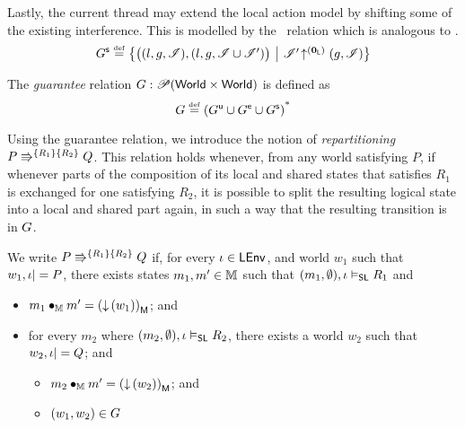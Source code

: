 Lastly, the current thread may extend the local action model by shifting some of the existing interference. This is modelled by the \shiftG\ relation which is analogous to \shiftR.
%
\[
\shiftG \eqdef
\left\{
\begin{array}{@{} l @{\hspace*{5pt}} | @{\hspace*{5pt}} r @{}}
  \left(
  \begin{array}{@{} l @{}}
    (l, g, \lmod),
    \left( l, g, \lmod \cup \lmod'  \right)
  \end{array}
  \right)
  &
  \expandsAM{\lmod'}{\unitL}{g}{\lmod}
\end{array}
\right\}
\]

\begin{definition}[Guarantee]
The \emph{guarantee} relation $\guarantee: \powerset (\Worlds \times \Worlds)$ is defined as
\[
\guarantee \eqdef  \left( \updateG \cup \extendG \cup \shiftG \right)^{\text{*}}
\]
\end{definition}

Using the guarantee relation, we introduce the notion of \emph{repartitioning} $\repartitions{P}{Q}{R_1}{R_2}$. This relation holds whenever, from any world satisfying $P$, if whenever parts of the composition of its local and shared states that satisfies $R_1$ is exchanged for one satisfying $R_2$, it is possible to split the resulting logical state into a local and shared part again, in such a way that the resulting transition is in $\guarantee$.
%
%
\begin{definition}[Repartitioning] \label{def:repartitioning}
We write $\repartitions{P}{Q}{R_1}{R_2}$ if, for every $\lenv \in \LEnv$, and world $w_1$ such that $w_1, \lenv |= P$, there exists states $m_1, m' \in \Heaps$ such that $(m_1, \emptyset), \lenv \slsat R_1$ and
\begin{itemize} 
\item $m_1 \composeH m' = \heapPart{\left(\collapseW{w_1}\right)}$; and
\item for every $m_2$ where $(m_2, \emptyset), \lenv \slsat R_2$,
  there exists a world $w_2$ such that $w_2, \lenv |= Q$; and
  \begin{itemize}
  	\item $m_2 \composeH m' = \heapPart{\left(\collapseW{w_2}\right)}$; and
  	\item $(w_1, w_2) \in \guarantee$
  \end{itemize}
\end{itemize}
\end{definition}

